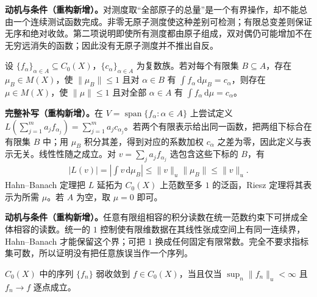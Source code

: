 \documentclass[../../main.tex]{subfiles}
\begin{document}
\begin{remark}
\textbf{动机与条件（重构新增）。}对测度取“全部原子的总量”是一个有界操作，却不能总由一个连续测试函数完成。非零无原子测度使这种差别可检测；有限总变差则保证无序和绝对收敛。第二项说明即使所有测度都由原子组成，双对偶仍可能增加不在无穷远消失的函数；因此没有无原子测度并不推出自反。
\end{remark}
\begin{exercise}\label{exercise:ch07-finite-moment-constraints}
设 $\{f_\alpha\}_{\alpha\in A}\subseteq C_0(X)$，$\{c_\alpha\}_{\alpha\in A}$ 为复数族。若对每个有限集 $B\subseteq A$，存在 $\mu_B\in M(X)$，使 $\|\mu_B\|\leqslant1$ 且对 $\alpha\in B$ 有 $\int f_\alpha\,\mathrm d\mu_B=c_\alpha$，则存在 $\mu\in M(X)$，使 $\|\mu\|\leqslant1$ 且对全部 $\alpha\in A$ 有 $\int f_\alpha\,\mathrm d\mu=c_\alpha$。
\end{exercise}
\begin{solution}
\textbf{完整补写（重构新增）。}在 $V=\operatorname{span}\{f_\alpha:\alpha\in A\}$ 上尝试定义 $L(\sum_{j=1}^ma_jf_{\alpha_j})=\sum_{j=1}^ma_jc_{\alpha_j}$。若两个有限表示给出同一函数，把两组下标合在有限集 $B$ 中；用 $\mu_B$ 积分其差，得到对应的系数加权 $c_\alpha$ 之差为零，因此定义与表示无关。线性性随之成立。对 $v=\sum_ja_jf_{\alpha_j}$ 选包含这些下标的 $B$，有
\begin{align*}
|L(v)|=\left|\int v\,\mathrm d\mu_B\right|\leqslant\|v\|_u\|\mu_B\|\leqslant\|v\|_u.
\end{align*}
Hahn--Banach 定理把 $L$ 延拓为 $C_0(X)$ 上范数至多 $1$ 的泛函，Riesz 定理将其表示为所需 $\mu$。若 $A$ 为空，取 $\mu=0$ 即可。
\end{solution}
\begin{remark}
\textbf{动机与条件（重构新增）。}任意有限组相容的积分读数在统一范数约束下可拼成全体相容的读数。统一的 $1$ 控制使有限维数据在其线性张成空间上有同一连续界，Hahn--Banach 才能保留这个界；可把 $1$ 换成任何固定有限常数。完全不要求指标集可数，所以证明没有把任意族误当作一个序列。
\end{remark}
\begin{exercise}\label{exercise:ch07-czero-weak-sequences}
$C_0(X)$ 中的序列 $\{f_n\}$ 弱收敛到 $f\in C_0(X)$，当且仅当 $\sup_n\|f_n\|_u<\infty$ 且 $f_n\to f$ 逐点成立。
\end{exercise}
\end{document}
